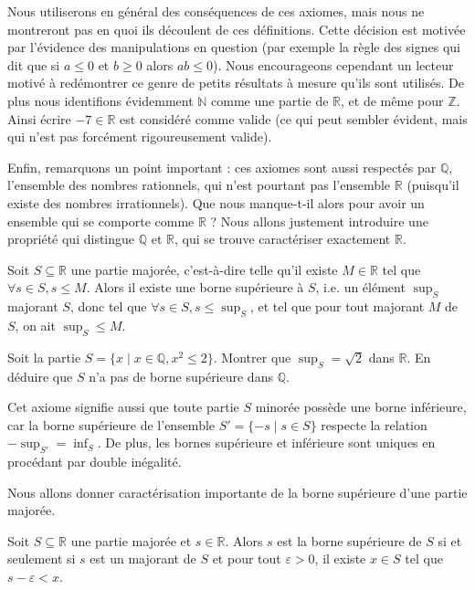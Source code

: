 Nous utiliserons en général des conséquences de ces axiomes, mais nous ne montreront pas en quoi ils découlent de ces définitions. Cette décision est motivée par l'évidence des manipulations en question (par exemple la règle des signes qui dit que si $a\leq 0$ et $b\geq 0$ alors $ab\leq 0$). Nous encourageons cependant un lecteur motivé à redémontrer ce genre de petits résultats à mesure qu'ils sont utilisés. De plus nous identifions évidemment $\mathbb N$ comme une partie de $\mathbb R$, et de même pour $\mathbb Z$. Ainsi écrire $-7\in\mathbb R$ est considéré comme valide (ce qui peut sembler évident, mais qui n'est pas forcément rigoureusement valide).

Enfin, remarquons un point important : ces axiomes sont aussi respectés par $\mathbb Q$, l'ensemble des nombres rationnels, qui n'est pourtant pas l'ensemble $\mathbb R$ (puisqu'il existe des nombres irrationnels). Que nous manque-t-il alors pour avoir un ensemble qui se comporte comme $\mathbb R$ ? Nous allons justement introduire une propriété qui distingue $\mathbb Q$ et $\mathbb R$, qui se trouve caractériser exactement $\mathbb R$.

\begin{ax}
    Soit $S\subseteq \mathbb R$ une partie majorée, c'est-à-dire telle qu'il existe $M\in\mathbb R$ tel que $\forall s\in S, s\leq M$. Alors il existe une borne supérieure à $S$, i.e. un élément $\sup_S$ majorant $S$, donc tel que $\forall s\in S, s\leq \sup_S$, et tel que pour tout majorant $M$ de $S$, on ait $\sup_S\leq M$.
\end{ax}

\begin{exo}[*]
    Soit la partie $S = \{ x \mid x\in \mathbb Q, x^2\leq 2\}$. Montrer que $\sup_S = \sqrt{2}$ dans $\mathbb R$. En déduire que $S$ n'a pas de borne supérieure dans $\mathbb Q$.
\end{exo}

\begin{rmk}
    Cet axiome signifie aussi que toute partie $S$ minorée possède une borne inférieure, car la borne supérieure de l'ensemble $S' = \{-s\mid s\in S\}$ respecte la relation $-\sup_{S'} = \inf_S$. De plus, les bornes supérieure et inférieure sont uniques en procédant par double inégalité.
\end{rmk}

Nous allons donner caractérisation importante de la borne supérieure d'une partie majorée.

\begin{prop}\label{prop:borne_sup_carac}
    Soit $S\subseteq \mathbb R$ une partie majorée et $s\in\mathbb R$. Alors $s$ est la borne supérieure de $S$ si et seulement si $s$ est un majorant de $S$ et pour tout $\varepsilon > 0$, il existe $x\in S$ tel que $s-\varepsilon < x$.
\end{prop}

